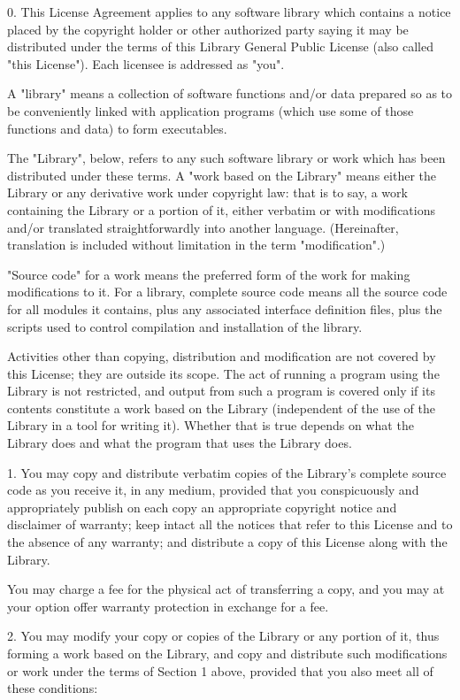 \documentclass[twoside]{tceusermanual}
\begin{document}
0. This License Agreement applies to any software library which
contains a notice placed by the copyright holder or other
authorized party saying it may be distributed under the terms of
this Library General Public License (also called "this
License").  Each licensee is addressed as "you".

A "library" means a collection of software functions and/or data
prepared so as to be conveniently linked with application
programs (which use some of those functions and data) to form
executables.

The "Library", below, refers to any such software library or
work which has been distributed under these terms.  A "work
based on the Library" means either the Library or any derivative
work under copyright law: that is to say, a work containing the
Library or a portion of it, either verbatim or with
modifications and/or translated straightforwardly into another
language.  (Hereinafter, translation is included without
limitation in the term "modification".)

"Source code" for a work means the preferred form of the work
for making modifications to it.  For a library, complete source
code means all the source code for all modules it contains, plus
any associated interface definition files, plus the scripts used
to control compilation and installation of the library.

Activities other than copying, distribution and modification are
not covered by this License; they are outside its scope.  The
act of running a program using the Library is not restricted,
and output from such a program is covered only if its contents
constitute a work based on the Library (independent of the use
of the Library in a tool for writing it).  Whether that is true
depends on what the Library does and what the program that uses
the Library does.
  
1. You may copy and distribute verbatim copies of the Library's
complete source code as you receive it, in any medium, provided
that you conspicuously and appropriately publish on each copy an
appropriate copyright notice and disclaimer of warranty; keep
intact all the notices that refer to this License and to the
absence of any warranty; and distribute a copy of this License
along with the Library.

You may charge a fee for the physical act of transferring a
copy, and you may at your option offer warranty protection in
exchange for a fee.
 
2. You may modify your copy or copies of the Library or any
portion of it, thus forming a work based on the Library, and
copy and distribute such modifications or work under the terms
of Section 1 above, provided that you also meet all of these
conditions:
\end{document}
